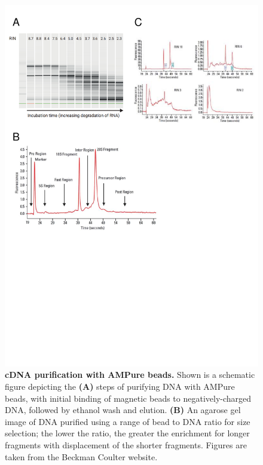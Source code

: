 \begin{figure}[!h]
	\centering
	\includegraphics[page=3,trim={0 8cm 0 0cm},clip, scale = 0.7]{Figures/General_Methodology_Figures.pdf}
	\captionsetup{width=0.95\textwidth}
	\caption[cDNA purification with AMPure beads]%
	{\textbf{cDNA purification with AMPure beads.} Shown is a schematic figure depicting the \textbf{(A)} steps of purifying DNA with AMPure beads, with initial binding of magnetic beads to negatively-charged DNA, followed by ethanol wash and elution. \textbf{(B)} An agarose gel image of DNA purified using a range of bead to DNA ratio for size selection; the lower the ratio, the greater the enrichment for longer fragments with displacement of the shorter fragments. Figures are taken from the Beckman Coulter website.}
	\label{fig:ampure_bead_workflow}
\end{figure}

